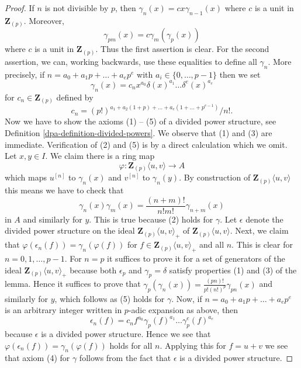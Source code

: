 \begin{proof}

If $n$ is not divisible by $p$, then $\gamma_n(x) = c x \gamma_{n - 1}(x)$
where $c$ is a unit in $\mathbf{Z}_{(p)}$. Moreover,
$$
\gamma_{pm}(x) = c \gamma_m(\gamma_p(x))
$$
where $c$ is a unit in $\mathbf{Z}_{(p)}$. Thus the first assertion is clear.
For the second assertion, we can, working backwards, use these equalities
to define all $\gamma_n$. More precisely, if
$n = a_0 + a_1p + \ldots + a_e p^e$ with $a_i \in \{0, \ldots, p - 1\}$ then
we set
$$
\gamma_n(x) = c_n x^{a_0} \delta(x)^{a_1} \ldots \delta^e(x)^{a_e}
$$
for $c_n \in \mathbf{Z}_{(p)}$ defined by
$$
c_n =
{(p!)^{a_1 + a_2(1 + p) + \ldots + a_e(1 + \ldots + p^{e - 1})}}/{n!}.
$$
Now we have to show the axioms (1) -- (5) of a divided power structure, see
Definition \ref{dpa-definition-divided-powers}. We observe that (1) and (3) are
immediate. Verification of (2) and (5) is by a direct calculation which
we omit. Let $x, y \in I$. We claim there is a ring map
$$
\varphi : \mathbf{Z}_{(p)}\langle u, v \rangle \longrightarrow A
$$
which maps $u^{[n]}$ to $\gamma_n(x)$ and $v^{[n]}$ to $\gamma_n(y)$.
By construction of $\mathbf{Z}_{(p)}\langle u, v \rangle$ this means
we have to check that
$$
\gamma_n(x)\gamma_m(x) = \frac{(n + m)!}{n!m!} \gamma_{n + m}(x)
$$
in $A$ and similarly for $y$. This is true because (2) holds for $\gamma$.
Let $\epsilon$ denote the divided power structure on the
ideal $\mathbf{Z}_{(p)}\langle u, v\rangle_{+}$ of
$\mathbf{Z}_{(p)}\langle u, v\rangle$.
Next, we claim that $\varphi(\epsilon_n(f)) = \gamma_n(\varphi(f))$
for $f \in \mathbf{Z}_{(p)}\langle u, v\rangle_{+}$ and all $n$.
This is clear for $n = 0, 1, \ldots, p - 1$. For $n = p$ it suffices
to prove it for a set of generators of the ideal
$\mathbf{Z}_{(p)}\langle u, v\rangle_{+}$ because both $\epsilon_p$
and $\gamma_p = \delta$ satisfy properties (1) and (3) of the lemma.
Hence it suffices to prove that
$\gamma_p(\gamma_n(x)) = \frac{(pn)!}{p!(n!)^p}\gamma_{pn}(x)$ and
similarly for $y$, which follows as (5) holds for $\gamma$.
Now, if $n = a_0 + a_1p + \ldots + a_e p^e$
is an arbitrary integer written in $p$-adic expansion as above, then
$$
\epsilon_n(f) =
c_n f^{a_0} \gamma_p(f)^{a_1} \ldots \gamma_p^e(f)^{a_e}
$$
because $\epsilon$ is a divided power structure. Hence we see that
$\varphi(\epsilon_n(f)) = \gamma_n(\varphi(f))$ holds for all $n$.
Applying this for $f = u + v$ we see that axiom (4) for $\gamma$
follows from the fact that $\epsilon$ is a divided power structure.
\end{proof}

